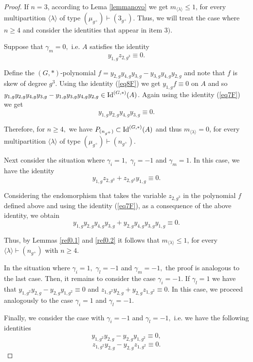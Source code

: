 \documentclass{amsart}
\newcommand{\IdG}{\ensuremath{\textnormal{Id}^{(G,\ast)}}}
\numberwithin{equation}{section}
\begin{document}
\begin{proof}
    If $n=3$, according to Lema \ref{lemmanovo} we get $m_{\langle \lambda \rangle}\le 1$, for every multipartition $\langle \lambda \rangle$ of type $(\mu_{g^+})\vdash (3_{g^+})$.  Thus, we will treat the case where $n\geq 4$ and consider the identities that appear in item $3).$  
    
    Suppose that $\gamma_{m}=0,$ i.e. $A$ satisfies the identity 
\begin{equation}\label{eq8F} y_{1,g}z_{2,g^3} \equiv 0.
	\end{equation} 

    Define the $(G,*)$-polynomial $f=y_{2,g}y_{4,g}y_{3,g}-y_{3,g}y_{4,g}y_{2,g}$ and note that $f$ is skew of degree $g^3$. Using the identity (\ref{eq8F}) we get $y_{1,g}f\equiv 0$ on $A$ and so $y_{1,g}y_{2,g}y_{4,g}y_{3,g}-y_{1,g}y_{3,g}y_{4,g}y_{2,g}\in \IdG(A)$. Again using the identity (\ref{eq7F}) we get 
$$y_{1,g}y_{2,g}y_{4,g}y_{3,g}\equiv 0. $$ 

Therefore, for $n\geq 4,$ we have $P_{(n_{g^+})}\subset \IdG(A)$ and thus $m_{\langle \lambda \rangle}= 0$, for every multipartition $\langle \lambda \rangle $ of type $(\mu_{g^+})\vdash (n_{g^+})$. 

 Next consider the situation where $\gamma_{i}=1,$ $\gamma_{l}=-1$ and $\gamma_{m}=1$. In this case, we have the identity 
	$$y_{1,g}z_{2,g^3} + z_{2,g^3}y_{1,g}\equiv 0.$$ 
    
    Considering the endomorphism that takes the variable $z_{2,g^3}$ in the polynomial $f$ defined above and using the identity (\ref{eq7F}),  as a consequence of the above identity, we obtain  
\begin{equation}\label{eq9F} y_{1,g}y_{2,g}y_{4,g}y_{3,g}+y_{2,g}y_{4,g}y_{3,g}y_{1,g}\equiv 0.
	\end{equation} 

Thus,  by Lemmas \ref{ref0.1} and \ref{ref0.2} it follows that $m_{\langle \lambda \rangle}\le 1$, for every $\langle \lambda \rangle \vdash (n_{g^+})$ with $n\geq 4.$
	
In the situation where $\gamma_{i}=1,$ $\gamma_{l}=-1$ and $\gamma_{m}=-1,$ 
	the proof is analogous to the last case. 
    Then, it remains to consider the case $\gamma_i=-1.$ 
     If $\gamma_{l}=1$ we have that 
	$y_{1,g^2}y_{2,g}-y_{2,g}y_{1,g^2}\equiv 0$
		and $z_{1,g^2}y_{2,g}+y_{2,g}z_{1,g^2}\equiv 0.$
In this case, we proceed analogously to the case  $\gamma_{i}=1$ and $\gamma_{l}=-1.$ 

Finally, we consider the case with $\gamma_{i}=-1$ and $\gamma_{l}=-1,$ i.e. we have the following identities
	$$y_{1,g^2}y_{2,g}-y_{2,g}y_{1,g^2}\equiv 0,$$
	$$ z_{1,g^2}y_{2,g}-y_{2,g}z_{1,g^2}\equiv 0.$$ 


\end{proof}
\end{document}
